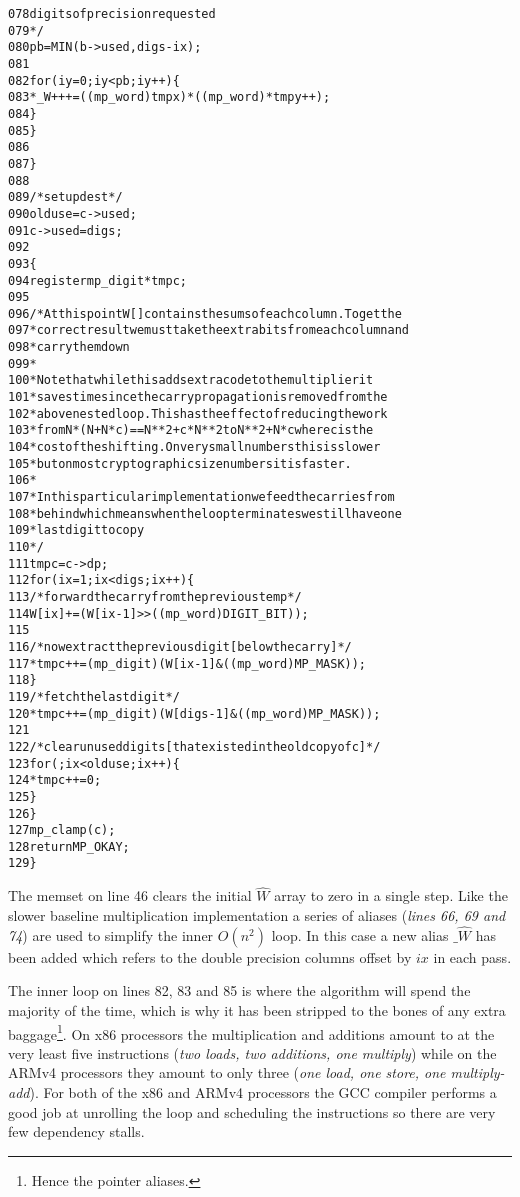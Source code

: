 \documentclass[b5paper]{book}
\begin{document}
\begin{small}
\begin{alltt}
078            digits of precision requested
079          */
080         pb = MIN (b->used, digs - ix);
081   
082         for (iy = 0; iy < pb; iy++) \{
083           *_W++ += ((mp_word)tmpx) * ((mp_word)*tmpy++);
084         \}
085       \}
086   
087     \}
088   
089     /* setup dest */
090     olduse  = c->used;
091     c->used = digs;
092   
093     \{
094       register mp_digit *tmpc;
095   
096       /* At this point W[] contains the sums of each column.  To get the
097        * correct result we must take the extra bits from each column and
098        * carry them down
099        *
100        * Note that while this adds extra code to the multiplier it 
101        * saves time since the carry propagation is removed from the 
102        * above nested loop.This has the effect of reducing the work 
103        * from N*(N+N*c)==N**2 + c*N**2 to N**2 + N*c where c is the 
104        * cost of the shifting.  On very small numbers this is slower 
105        * but on most cryptographic size numbers it is faster.
106        *
107        * In this particular implementation we feed the carries from
108        * behind which means when the loop terminates we still have one
109        * last digit to copy
110        */
111       tmpc = c->dp;
112       for (ix = 1; ix < digs; ix++) \{
113         /* forward the carry from the previous temp */
114         W[ix] += (W[ix - 1] >> ((mp_word) DIGIT_BIT));
115   
116         /* now extract the previous digit [below the carry] */
117         *tmpc++ = (mp_digit) (W[ix - 1] & ((mp_word) MP_MASK));
118       \}
119       /* fetch the last digit */
120       *tmpc++ = (mp_digit) (W[digs - 1] & ((mp_word) MP_MASK));
121   
122       /* clear unused digits [that existed in the old copy of c] */
123       for (; ix < olduse; ix++) \{
124         *tmpc++ = 0;
125       \}
126     \}
127     mp_clamp (c);
128     return MP_OKAY;
129   \}
\end{alltt}
\end{small}

The memset on line 46 clears the initial $\hat W$ array to zero in a single step. Like the slower baseline multiplication
implementation a series of aliases (\textit{lines 66, 69 and 74}) are used to simplify the inner $O(n^2)$ loop.  
In this case a new alias $\_\hat W$ has been added which refers to the double precision columns offset by $ix$ in each pass.  

The inner loop on lines 82, 83 and 85 is where the algorithm will spend the majority of the time, which is why it has been 
stripped to the bones of any extra baggage\footnote{Hence the pointer aliases.}.  On x86 processors the multiplication and additions amount to at the 
very least five instructions (\textit{two loads, two additions, one multiply}) while on the ARMv4 processors they amount to only three 
(\textit{one load, one store, one multiply-add}).   For both of the x86 and ARMv4 processors the GCC compiler performs a good job at unrolling the loop 
and scheduling the instructions so there are very few dependency stalls.
\end{document}
